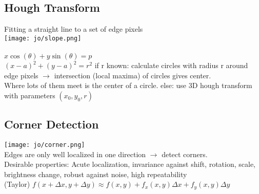 \subsection*{Hough Transform}
Fitting a straight line to a set of edge pixels\\
\texttt{[image: jo/slope.png]}\\
\\
$x \cos(\theta) + y \sin(\theta) = p$ \\
$(x - a)^{2} + (y - a)^{2} = r^{2}$
 if r known: calculate circles with radius r around edge pixels $\rightarrow$ intersection (local maxima) of circles gives center.\\ Where lots of them meet is the center of a circle. else: use 3D hough transform with parameters $(x_0, y_0, r)$
\subsection*{Corner Detection}\texttt{[image: jo/corner.png]}\\
Edges are only well localized in one direction $\rightarrow$ detect corners.\\
Desirable properties: Acute localization, invariance against shift, rotation, scale, brightness change, robust against noise, high repeatability\\
 (Taylor) $f(x + \Delta x, y + \Delta y) \approx f(x, y) + f_x(x, y) \Delta x + f_y(x, y)\Delta y$
